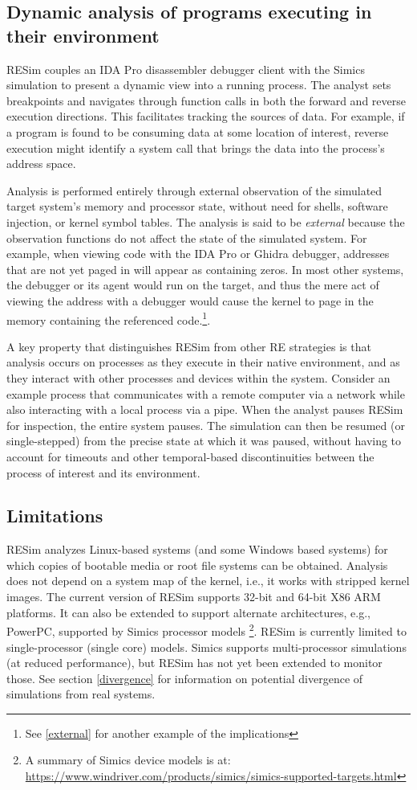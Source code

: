 \documentclass[titlepage]{article}
\begin{document}
\subsection{Dynamic analysis of programs executing in their environment}
RESim couples an IDA Pro disassembler debugger client with the Simics simulation to present a dynamic view into a running process.  The analyst sets breakpoints and navigates through function calls in both the forward and reverse execution directions.  This facilitates tracking the sources of data.  For example, if a program is found to be consuming data at some location of interest, reverse execution might identify a system call that brings the data into the process’s address space.

Analysis is performed entirely through external observation of the simulated target system's memory and processor state, 
without need for shells, software injection, or kernel symbol tables.   The analysis is said to be \textit{external} because the observation functions do
not affect the state of the simulated system.  For example, when viewing code with the IDA Pro or Ghidra debugger, addresses that are not yet paged in will appear as containing zeros.
In most other systems, the debugger or its agent would run on the target, and thus the mere act of viewing the address with a debugger 
would cause the kernel to page
in the memory containing the referenced code.\footnote{See \ref{external} for another example of the implications}.

A key property that distinguishes RESim from other RE strategies is that analysis occurs on processes as they execute in their native environment, and as they interact with other processes and devices within the system.  Consider an example process that communicates with a remote computer via a network while also interacting with a local process via a pipe.  When the analyst pauses RESim for inspection, the entire system pauses.  The simulation can then be resumed (or single-stepped) from the precise state at which it was paused, without having to account for timeouts and other temporal-based discontinuities between the process of interest and its environment.

\subsection{Limitations}
RESim analyzes Linux-based systems (and some Windows based systems) for which copies of bootable media or root file systems can be obtained.  Analysis does not depend on a system map of the kernel, i.e., it works with stripped kernel images.  The current version of RESim supports 32-bit and 64-bit X86 ARM platforms.  It can also be 
extended to support alternate architectures, e.g., PowerPC, supported by Simics processor models \footnote{A summary of Simics device models is at: \url{https://www.windriver.com/products/simics/simics-supported-targets.html}}.  RESim is currently limited to single-processor (single core) models.  Simics supports
multi-processor simulations (at reduced performance), but RESim has not yet been extended to monitor those.
See section \ref{divergence} for information on potential divergence of simulations from real systems.
\end{document}
